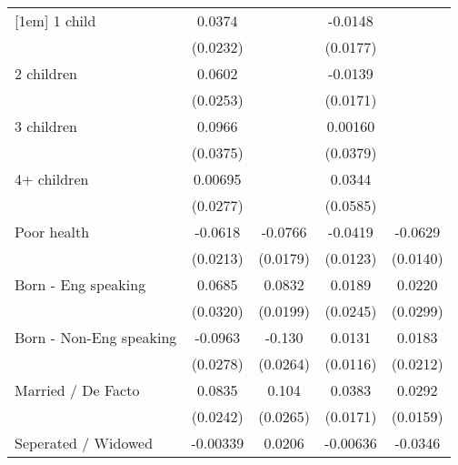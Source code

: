 {\begin{tabular}{l*{4}{c}}
[1em]
1 child             &      0.0374         &                     &     -0.0148         &                     \\
                    &    (0.0232)         &                     &    (0.0177)         &                     \\
[1em]
2 children          &      0.0602\sym{*}  &                     &     -0.0139         &                     \\
                    &    (0.0253)         &                     &    (0.0171)         &                     \\
[1em]
3 children          &      0.0966\sym{*}  &                     &     0.00160         &                     \\
                    &    (0.0375)         &                     &    (0.0379)         &                     \\
[1em]
4+ children         &     0.00695         &                     &      0.0344         &                     \\
                    &    (0.0277)         &                     &    (0.0585)         &                     \\
[1em]
Poor health         &     -0.0618\sym{**} &     -0.0766\sym{***}&     -0.0419\sym{***}&     -0.0629\sym{***}\\
                    &    (0.0213)         &    (0.0179)         &    (0.0123)         &    (0.0140)         \\
[1em]
Born - Eng speaking &      0.0685\sym{*}  &      0.0832\sym{***}&      0.0189         &      0.0220         \\
                    &    (0.0320)         &    (0.0199)         &    (0.0245)         &    (0.0299)         \\
[1em]
Born - Non-Eng speaking&     -0.0963\sym{***}&      -0.130\sym{***}&      0.0131         &      0.0183         \\
                    &    (0.0278)         &    (0.0264)         &    (0.0116)         &    (0.0212)         \\
[1em]
Married / De Facto  &      0.0835\sym{***}&       0.104\sym{***}&      0.0383\sym{*}  &      0.0292         \\
                    &    (0.0242)         &    (0.0265)         &    (0.0171)         &    (0.0159)         \\
[1em]
Seperated / Widowed &    -0.00339         &      0.0206         &    -0.00636         &     -0.0346         \\

\end{tabular}}
